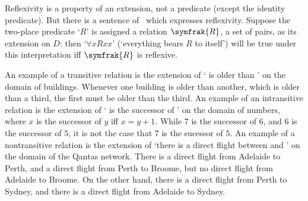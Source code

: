 Reflexivity is a property of an extension, not a predicate (except the identity predicate). But there is a sentence of \FOL\ which expresses reflexivity. Suppose the two-place predicate `$R$' is assigned a relation $\symfrak{R}$, a set of pairs, as its extension on $D$: then `$\forall x Rxx$' (`everything bears $R$ to itself') will be true under this interpretation iff $\symfrak{R}$ is reflexive. 

An example of a transitive relation is the extension of ` is older than ' on the domain of buildings. Whenever one building is older than another, which is older than a third, the first must be older than the third. An example of an intransitive relation is the extension of ` is the successor of ' on the domain of numbers, where $x$ is the successor of $y$ iff $x = y+1$. While $7$ is the successor of $6$, and $6$ is the successor of $5$, it is not the case that $7$ is the sucessor of $5$. An example of a nontransitive relation is the extension of `there is a direct flight between  and ' on the domain of the Qantas network. There is a direct flight from Adelaide to Perth, and a direct flight from Perth to Broome, but no direct flight from Adelaide to Broome. On the other hand, there is a direct flight from Perth to Sydney, and there is a direct flight from Adelaide to Sydney. 

